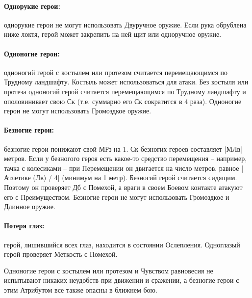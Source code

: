\paragraph{Однорукие герои:} однорукие герои не могут использовать Двуручное оружие. Если рука обрублена ниже локтя, герой может закрепить на ней щит или одноручное оружие.
\paragraph{Одноногие герои:} одноногий герой с костылем или протезом считается перемещающимся по Трудному ландшафту. Костыль может использоваться для атаки. Без костыля или протеза одноногий герой считается перемещающимся по Трудному ландшафту и ополовинивает свою Ск (т.е. суммарно его Ск сократится в 4 раза). Одноногие герои не могут использовать Громоздкое оружие.
\paragraph{Безногие герои:} безногие герои понижают свой МРз на 1. Ск безногих героев составляет |МЛв| метров. Если у безногого героя есть какое-то средство перемещения – например, тачка с колесиками – при Перемещении он двигается на число метров, равное |Атлетике (Лв) / 4| (минимум на 1 метр). Безногий герой считается сидящим. Поэтому он проверяет Дб с Помехой, а враги в своем Боевом контакте атакуют его с Преимуществом. Безногие герои не могут использовать Громоздкое и Длинное оружие.
\paragraph{Потеря глаз:} герой, лишившийся всех глаз, находится в состоянии Ослепления. Одноглазый герой проверяет Меткость с Помехой. 
\begin{tcolorbox}
  Одноногие герои с костылем или протезом и Чувством равновесия не испытывают никаких неудобств при движении и сражении, а безногие герои с этим Атрибутом все также опасны в ближнем бою.
\end{tcolorbox}

